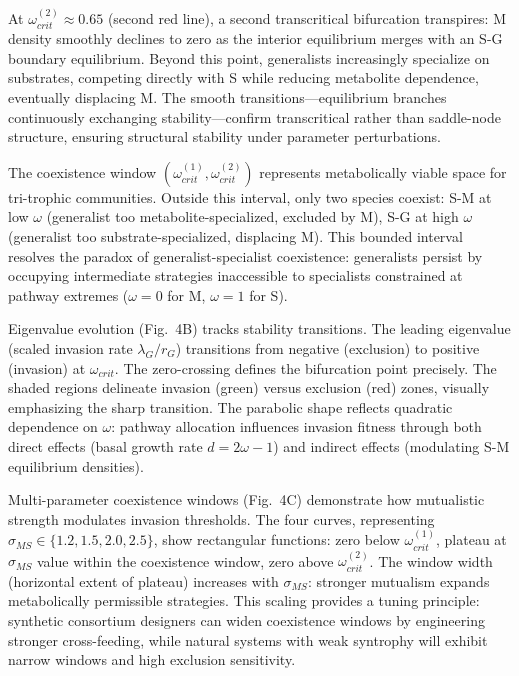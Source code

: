 \documentclass[9pt,twocolumn,twoside]{pnas-new}
\begin{document}
At $\omega_{crit}^{(2)} \approx 0.65$ (second red line), a second transcritical bifurcation transpires: M density smoothly declines to zero as the interior equilibrium merges with an S-G boundary equilibrium. Beyond this point, generalists increasingly specialize on substrates, competing directly with S while reducing metabolite dependence, eventually displacing M. The smooth transitions—equilibrium branches continuously exchanging stability—confirm transcritical rather than saddle-node structure, ensuring structural stability under parameter perturbations.

The coexistence window $(\omega_{crit}^{(1)}, \omega_{crit}^{(2)})$ represents metabolically viable space for tri-trophic communities. Outside this interval, only two species coexist: S-M at low $\omega$ (generalist too metabolite-specialized, excluded by M), S-G at high $\omega$ (generalist too substrate-specialized, displacing M). This bounded interval resolves the paradox of generalist-specialist coexistence: generalists persist by occupying intermediate strategies inaccessible to specialists constrained at pathway extremes ($\omega = 0$ for M, $\omega = 1$ for S).

Eigenvalue evolution (Fig.~4B) tracks stability transitions. The leading eigenvalue (scaled invasion rate $\lambda_G/r_G$) transitions from negative (exclusion) to positive (invasion) at $\omega_{crit}$. The zero-crossing defines the bifurcation point precisely. The shaded regions delineate invasion (green) versus exclusion (red) zones, visually emphasizing the sharp transition. The parabolic shape reflects quadratic dependence on $\omega$: pathway allocation influences invasion fitness through both direct effects (basal growth rate $d = 2\omega - 1$) and indirect effects (modulating S-M equilibrium densities).

Multi-parameter coexistence windows (Fig.~4C) demonstrate how mutualistic strength modulates invasion thresholds. The four curves, representing $\sigma_{MS} \in \{1.2, 1.5, 2.0, 2.5\}$, show rectangular functions: zero below $\omega_{crit}^{(1)}$, plateau at $\sigma_{MS}$ value within the coexistence window, zero above $\omega_{crit}^{(2)}$. The window width (horizontal extent of plateau) increases with $\sigma_{MS}$: stronger mutualism expands metabolically permissible strategies. This scaling provides a tuning principle: synthetic consortium designers can widen coexistence windows by engineering stronger cross-feeding, while natural systems with weak syntrophy will exhibit narrow windows and high exclusion sensitivity.
\end{document}
